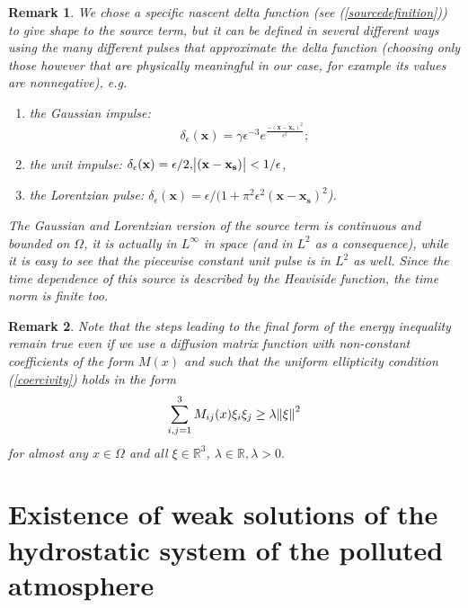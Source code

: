 \documentclass[12pt]{report}
\numberwithin{theorem}{chapter}
\numberwithin{corollary}{chapter}
\numberwithin{lemma}{chapter}
\newtheorem{remark}{Remark}
\numberwithin{remark}{chapter}
\numberwithin{definition}{chapter}
\numberwithin{prop}{chapter}
\begin{document}
\begin{remark} \label{source_options}
\normalfont We chose a specific nascent delta function (see (\ref{sourcedefinition})) to give shape to the source term, but it can be defined in several different ways using the many different pulses that approximate the delta function (choosing only those however that are physically meaningful in our case, for example its values are nonnegative), e.g.

  \begin{enumerate}
  
    \item the Gaussian impulse: \[\delta_\epsilon (\mathbf{x}) = \gamma \epsilon^{-3} e ^ {\frac{-(\mathbf{x}-\mathbf{x_s})^2}{\epsilon^2}};\]
  
    \item the unit impulse: $\delta_\epsilon (\mathbf{x}) = \epsilon/2, \abs{(\mathbf{x}-\mathbf{x_s})} < 1/\epsilon $,
  
    \item the Lorentzian pulse: $\delta_\epsilon (\mathbf{x}) = \epsilon / (1 + \pi^2 \epsilon^2 (\mathbf{x}-\mathbf{x_s})^2$).

  \end{enumerate}
  
  The Gaussian and Lorentzian version of the source term is continuous and bounded on $\Omega$, it is actually in $L^\infty$ in space (and in $L^2$ as a consequence), while it is easy to see that the piecewise constant unit pulse is in $L^2$ as well. Since the time dependence of this source is described by the Heaviside function, the time norm is finite too.
  
\end{remark}

\begin{remark}
\normalfont Note that the steps leading to the final form of the energy inequality remain true even if we use a diffusion matrix function with non-constant coefficients of the form $M(x)$ and such that the uniform ellipticity condition (\ref{coercivity}) holds in the form
%
\begin{equation}
   \sum_{i,j = 1}^3 M_{ij}(x) \xi_i \xi_j \geq \lambda \norm{\xi}^2
\end{equation}
%
for almost any $x \in \Omega$ and all $\xi \in \mathbb{R}^3$, $\lambda \in \mathbb{R}, \lambda > 0.$
\end{remark}

\section{Existence of weak solutions of the hydrostatic system of the polluted atmosphere}\label{existenceweakhydrostatic}
\end{document}
